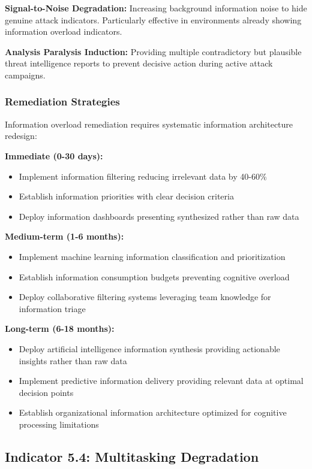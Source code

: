 \documentclass[11pt,a4paper]{article}
\begin{document}
\textbf{Signal-to-Noise Degradation:} Increasing background information noise to hide genuine attack indicators. Particularly effective in environments already showing information overload indicators.

\textbf{Analysis Paralysis Induction:} Providing multiple contradictory but plausible threat intelligence reports to prevent decisive action during active attack campaigns.

\subsubsection{Remediation Strategies}

Information overload remediation requires systematic information architecture redesign:

\textbf{Immediate (0-30 days):}
\begin{itemize}
\item Implement information filtering reducing irrelevant data by 40-60\%
\item Establish information priorities with clear decision criteria
\item Deploy information dashboards presenting synthesized rather than raw data
\end{itemize}

\textbf{Medium-term (1-6 months):}
\begin{itemize}
\item Implement machine learning information classification and prioritization
\item Establish information consumption budgets preventing cognitive overload
\item Deploy collaborative filtering systems leveraging team knowledge for information triage
\end{itemize}

\textbf{Long-term (6-18 months):}
\begin{itemize}
\item Deploy artificial intelligence information synthesis providing actionable insights rather than raw data
\item Implement predictive information delivery providing relevant data at optimal decision points
\item Establish organizational information architecture optimized for cognitive processing limitations
\end{itemize}

\subsection{Indicator 5.4: Multitasking Degradation}
\end{document}
